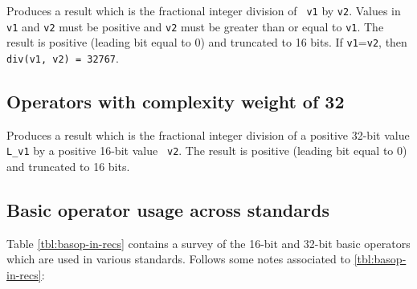 Produces a result which is the fractional integer division of {\tt
v1} by {\tt v2}. Values in {\tt v1} and {\tt v2} must be positive
and {\tt v2} must be greater than or equal to {\tt v1}. The result
is positive (leading bit equal to 0) and truncated to 16 bits. If
{\tt v1}={\tt v2}, then {\tt div(v1, v2) = 32767}.

\subsection{Operators with complexity weight of 32}


Produces a result which is the fractional integer division of a
positive 32-bit value {\tt L\_v1} by a positive 16-bit value {\tt
v2}. The result is positive (leading bit equal to 0) and truncated
to 16 bits.

\subsection{Basic operator usage across standards}

Table \ref{tbl:basop-in-recs} contains a survey of the 16-bit and
32-bit basic operators which are used in various standards.
Follows some notes associated to \ref{tbl:basop-in-recs}:

